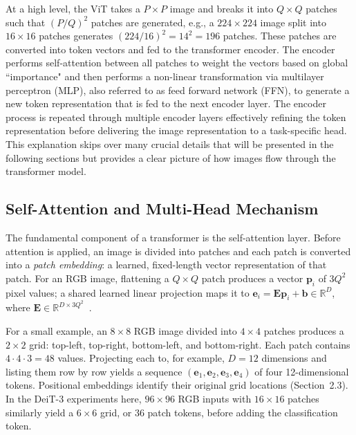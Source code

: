 \documentclass[runningheads,a4paper]{llncs}
\begin{document}
At a high level, the ViT takes a $P \times P$ image and breaks it into $Q \times Q$ patches such that $\left(P/Q\right)^2$ patches are generated, e.g., a $224 \times 224$ image split into $16 \times 16$ patches generates $\left(224/16\right)^2=14^2=196$ patches. These patches are converted into token vectors and fed to the transformer encoder. The encoder performs self-attention between all patches to weight the vectors based on global ``importance" and then performs a non-linear transformation via multilayer perceptron (MLP), also referred to as feed forward network (FFN), to generate a new token representation that is fed to the next encoder layer. The encoder process is repeated through multiple encoder layers effectively refining the token representation before delivering the image representation to a task-specific head. This explanation skips over many crucial details that will be presented in the following sections but provides a clear picture of how images flow through the transformer model.

\subsection{Self-Attention and Multi-Head Mechanism}
The fundamental component of a transformer is the self-attention layer. Before attention is applied, an image is divided into patches and each patch is converted into a \emph{patch embedding}: a learned, fixed-length vector representation of that patch. For an RGB image, flattening a $Q\times Q$ patch produces a vector $\mathbf{p}_i$ of $3Q^2$ pixel values; a shared learned linear projection maps it to $\mathbf{e}_i=\mathbf{E}\mathbf{p}_i+\mathbf{b}\in\mathbb{R}^{D}$, where $\mathbf{E}\in\mathbb{R}^{D\times3Q^2}$~\cite{dosovitskiy2021vit}.

For a small example, an $8\times8$ RGB image divided into $4\times4$ patches produces a $2\times2$ grid: top-left, top-right, bottom-left, and bottom-right. Each patch contains $4\cdot4\cdot3=48$ values. Projecting each to, for example, $D=12$ dimensions and listing them row by row yields a sequence $(\mathbf{e}_1,\mathbf{e}_2,\mathbf{e}_3,\mathbf{e}_4)$ of four 12-dimensional tokens. Positional embeddings identify their original grid locations (Section~2.3). In the DeiT-3 experiments here, $96\times96$ RGB inputs with $16\times16$ patches similarly yield a $6\times6$ grid, or 36 patch tokens, before adding the classification token.
\end{document}

